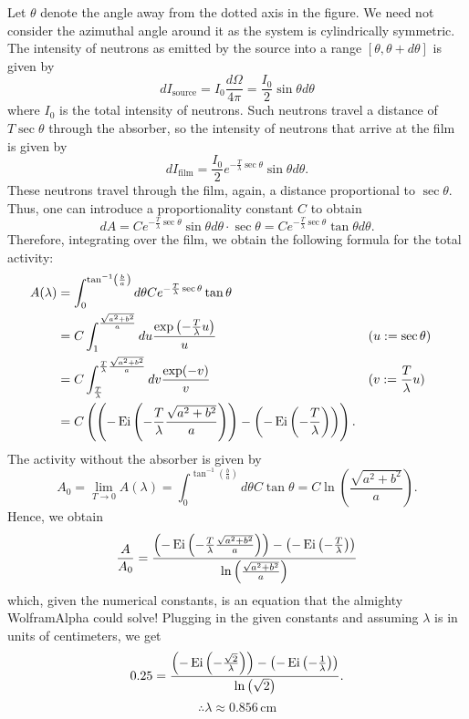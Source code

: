 \item

Let $\theta$ denote the angle away from the dotted axis in the figure.
We need not consider the azimuthal angle around it as the system is cylindrically symmetric.
The intensity of neutrons as emitted by the source into a range $[\theta, \theta + d\theta]$ is given by
\[
    dI_{\text{source}}
    = I_0 \frac{d\Omega}{4\pi}
    = \frac{I_0}{2} \sin \theta d\theta
\]
where $I_0$ is the total intensity of neutrons.
Such neutrons travel a distance of $T \sec \theta$ through the absorber,
so the intensity of neutrons that arrive at the film is given by
\[
    dI_{\text{film}}
    = \frac{I_0}{2} e^{-\frac{T}{\lambda} \sec \theta} \sin \theta d\theta.
\]
These neutrons travel through the film, again, a distance proportional to $\sec \theta$.
Thus, one can introduce a proportionality constant $C$ to obtain
\[
    dA
    = C e^{-\frac{T}{\lambda} \sec \theta} \sin \theta d\theta \cdot \sec \theta
    = C e^{-\frac{T}{\lambda} \sec \theta} \tan \theta d\theta.
\]
Therefore, integrating over the film, we obtain the following formula for the total activity:
\begin{align*}
    A(\lambda)
    &= \int_0^{\tan^{-1} \left( \frac{b}{a} \right)} d\theta C e^{-\frac{T}{\lambda} \sec \theta} \tan \theta \\
    &= C \int_1^{\frac{\sqrt{a^2 + b^2}}{a}} du \frac{\exp \left( -\frac{T}{\lambda} u \right)}{u}
       && (u := \sec \theta) \\
    &= C \int_{\frac{T}{\lambda}}^{\frac{T}{\lambda} \frac{\sqrt{a^2 + b^2}}{a}}
         dv \frac{\exp(-v)}{v}
       && (v := \frac{T}{\lambda}u) \\
    &= C \left(
            \left( -\operatorname{Ei}\left( -\frac{T}{\lambda}\frac{\sqrt{a^2 + b^2}}{a} \right) \right)
            - \left( -\operatorname{Ei}\left( -\frac{T}{\lambda} \right) \right)
       \right).
\end{align*}
The activity without the absorber is given by
\[
    A_0
    = \lim_{T \rightarrow 0} A(\lambda)
    = \int_0^{\tan^{-1} \left( \frac{b}{a} \right)} d\theta C \tan \theta
    = C \ln \left( \frac{\sqrt{a^2 + b^2}}{a} \right).
\]
Hence, we obtain
\[
    \frac{A}{A_0}
    = \frac{
        \left( -\operatorname{Ei}\left( -\frac{T}{\lambda}\frac{\sqrt{a^2 + b^2}}{a} \right) \right)
        - \left( -\operatorname{Ei}\left( -\frac{T}{\lambda} \right) \right)
    }{\ln \left( \frac{\sqrt{a^2 + b^2}}{a} \right)}
\]
which, given the numerical constants, is an equation that the almighty WolframAlpha could solve!
Plugging in the given constants and assuming $\lambda$ is in units of centimeters, we get
\[
    0.25 = \frac{
        \left( -\operatorname{Ei}\left( -\frac{\sqrt{2}}{\lambda} \right) \right)
        - \left( -\operatorname{Ei}\left( -\frac{1}{\lambda} \right) \right)
    }{\ln\left( \sqrt{2} \right)}.
\]
\[
    \therefore \lambda \approx 0.856\, \mathrm{cm}
\]